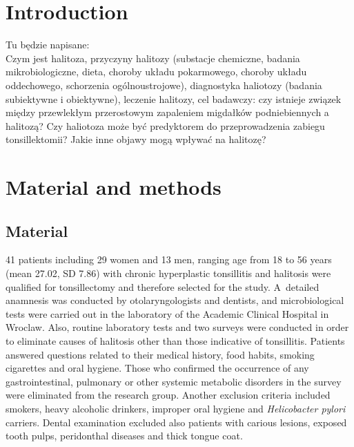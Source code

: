 \documentclass[12pt,a4paper,notitlepage]{report}
\begin{document}

\tableofcontents



\clearpage
\linespread{1.3}
\chapter{Introduction}
Tu będzie napisane: \\
Czym  jest halitoza, przyczyny halitozy (substacje chemiczne, badania mikrobiologiczne, dieta, choroby układu pokarmowego, choroby układu oddechowego, schorzenia ogólnoustrojowe), diagnostyka haliotozy (badania subiektywne i obiektywne), leczenie halitozy, cel badawczy: czy istnieje związek między przewlekłym przerostowym zapaleniem migdałków podniebiennych a halitozą? Czy haliotoza może być predyktorem do przeprowadzenia zabiegu tonsillektomii? Jakie inne objawy mogą wpływać na halitozę?

\chapter{Material and methods}
\section{Material}

41 patients including 29 women and 13 men, ranging age from 18 to 56 years (mean 27.02, SD 7.86) with chronic hyperplastic tonsillitis and halitosis were qualified for tonsillectomy and therefore selected for the study. \mbox{A detailed} anamnesis was conducted by otolaryngologists and dentists, and microbiological tests were carried out in the laboratory of the Academic Clinical Hospital in Wroclaw. Also, routine laboratory tests and two surveys were conducted in order to eliminate causes of halitosis other than those indicative of tonsillitis. Patients answered questions related to their medical history, food habits, smoking cigarettes and oral hygiene. 
Those who confirmed the occurrence of any gastrointestinal, pulmonary or other systemic metabolic disorders in the survey were eliminated from the research group.
Another exclusion criteria included smokers, heavy alcoholic drinkers, improper oral hygiene and \textit{Helicobacter pylori} carriers. Dental examination excluded also patients with carious lesions, exposed tooth pulps, peridonthal diseases and thick tongue coat.
\end{document}
